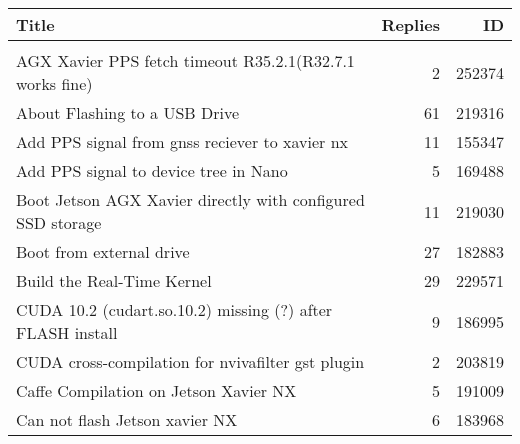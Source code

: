 \small
\begin{longtable}{p{}rr}
    Title                                                                                                                              & Replies & ID     \\
    \hline                                                                                                                                                \\
    AGX Xavier PPS fetch timeout R35.2.1(R32.7.1 works fine)                                                                           & 2       & 252374 \\
    About Flashing to a USB Drive                                                                                                      & 61      & 219316 \\
    Add PPS signal from gnss reciever to xavier nx                                                                                     & 11      & 155347 \\
    Add PPS signal to device tree in Nano                                                                                              & 5       & 169488 \\
    Boot Jetson AGX Xavier directly with configured SSD storage                                                                        & 11      & 219030 \\
    Boot from external drive                                                                                                           & 27      & 182883 \\
    Build the Real-Time Kernel                                                                                                         & 29      & 229571 \\
    CUDA 10.2 (cudart.so.10.2) missing (?) after FLASH install                                                                         & 9       & 186995 \\
    CUDA cross-compilation for nvivafilter gst plugin                                                                                  & 2       & 203819 \\
    Caffe Compilation on Jetson Xavier NX                                                                                              & 5       & 191009 \\
    Can not flash Jetson xavier NX                                                                                                     & 6       & 183968 \\

\end{longtable}
